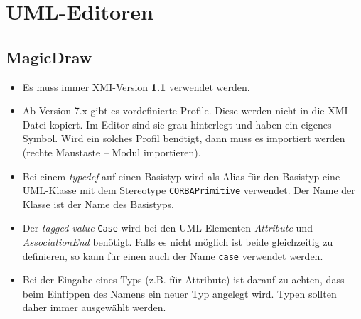 \documentclass [a4paper,10pt] {scrartcl}
\begin{document}

\cleardoublepage
\section{UML-Editoren}
\subsection{MagicDraw}
\begin{itemize}
\item Es muss immer \textsf{XMI}-Version \textbf{1.1} verwendet werden.
\item Ab Version 7.x gibt es vordefinierte Profile. Diese werden nicht in
    die \textsf{XMI}-Datei kopiert. Im Editor sind sie grau hinterlegt
    und haben ein eigenes Symbol. Wird ein solches Profil ben{\"o}tigt,
    dann muss es importiert werden (rechte Maustaste -- Modul importieren).
\item Bei einem \emph{typedef} auf einen Basistyp wird als Alias f{\"u}r den
    Basistyp eine UML-Klasse mit dem Stereotype \texttt{CORBAPrimitive}
    verwendet. Der Name der Klasse ist der Name des Basistyps.
\item Der \emph{tagged value} \texttt{Case} wird bei den UML-Elementen
    \emph{Attribute} und \emph{AssociationEnd} ben{\"o}tigt.
    Falls es nicht m{\"o}glich ist beide gleichzeitig zu definieren,
    so kann f{\"u}r einen auch der Name \texttt{case} verwendet werden.
\item Bei der Eingabe eines Typs (z.B. f{\"u}r Attribute) ist darauf
    zu achten, dass beim Eintippen des Namens ein neuer Typ angelegt wird.
    Typen sollten daher immer ausgew{\"a}hlt werden.
\end{itemize}
\end{document}
